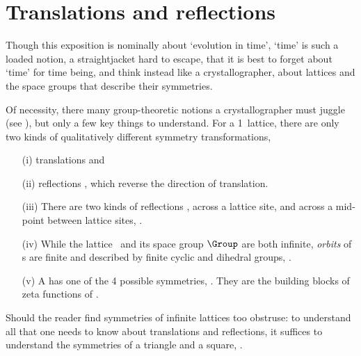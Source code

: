 

\section{Translations and reflections} %
\label{s:latt1d}
                                         \toCB

Though this exposition is nominally about `evolution in time', `time' is
such a loaded notion, a straightjacket hard to escape, that it is best to
forget about `time' for time being, and think instead like a
crystallographer, about lattices and the space groups that describe their
symmetries.

Of necessity, there many group-theoretic notions a crystallographer must
juggle (see ), but only a few key
things to understand.
For a 1\dmn\ lattice, there are only two kinds of qualitatively different
symmetry transformations,
\begin{itemize}
  \item[(i)]
translations 
and
  \item[(ii)]
reflections , which reverse the direction of translation.
  \item[(iii)]
There are two kinds of reflections ,
across a lattice site,
and
across a mid-point between lattice sites, .
  \item[(iv)]
While the lattice \lattice\ and its space group $\Group$ are both
infinite, \emph{orbits} of {\lattstate}s are finite and described
by finite cyclic and dihedral groups, .
  \item[(v)]
A {\lattstate} has one of the 4 possible symmetries,
. They are the building blocks of zeta
functions of .

\end{itemize}
Should the reader find symmetries of infinite lattices too obstruse:
to understand all that one needs to know about translations  and
reflections, it suffices to understand the symmetries of a
triangle and a square, .

